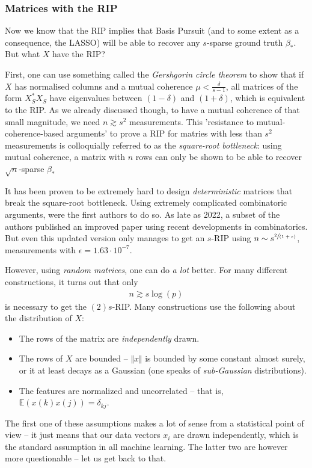 \documentclass{article}
\newcommand{\norm}[1]{\Vert #1 \Vert}
\begin{document}
\subsubsection{Matrices with the RIP}
Now we know that the RIP implies that Basis Pursuit (and to some extent as a consequence, the LASSO) will be able to recover any $s$-sparse ground truth $\beta_*$. But what $X$ have the RIP?

First, one can use something called the \emph{Gershgorin circle theorem} to show that if $X$ has normalised columns and a mutual coherence $\mu < \tfrac{\delta}{s-1}$, all matrices of the form $X_S^*X_S$  have eigenvalues between $(1-\delta)$ and $(1+\delta)$, which is equivalent to the RIP. As we already discussed though, to have a mutual coherence of that small magnitude, we need $n\gtrsim s^2$ measurements. This 'resistance to mutual-coherence-based arguments' to prove a RIP for matries with less than $s^2$ measurements is colloquially referred to as the \emph{square-root bottleneck}: using mutual coherence, a matrix with $n$ rows can only be shown to be able to recover $\sqrt{n}$-sparse $\beta_*$

It has been proven to be extremely hard to design \emph{deterministic} matrices that break the square-root bottleneck. Using extremely complicated combinatoric arguments, \cite{bourgain2011explicit} were the first authors to do so. As late as 2022, a subset of the authors published an improved paper \cite{ford2022explicit} using recent developments in combinatorics. But even this updated version only manages to get an $s$-RIP using $n\sim s^{\sfrac{2}{(1+\epsilon)}}$, measurements with $\epsilon=1.63\cdot 10^{-7}$.

However, using \emph{random matrices}, one can do \emph{a lot} better. For many different constructions, it turns out that only 
\begin{align*}
    n \gtrsim s\log(p)
\end{align*}
is necessary to get the $(2)s$-RIP. Many constructions use the following about the distribution of $X$:
\begin{itemize}
    \item The rows of the matrix are \emph{independently} drawn. 
    \item The rows of $X$ are bounded -- $\norm{x}$ is bounded by some constant almost surely, or it at least decays as a Gaussian (one speaks of \emph{sub-Gaussian} distributions). 
    \item The features are normalized and uncorrelated -- that is, $\mathbb{E}(x(k)x(j))=\delta_{kj}$.
\end{itemize}
The first one of these assumptions makes a lot of sense from a statistical point of view --  it just means that our data vectors $x_i$ are drawn independently, which is the standard assumption in all machine learning. The latter two are however more questionable -- let us get back to that.
\end{document}
